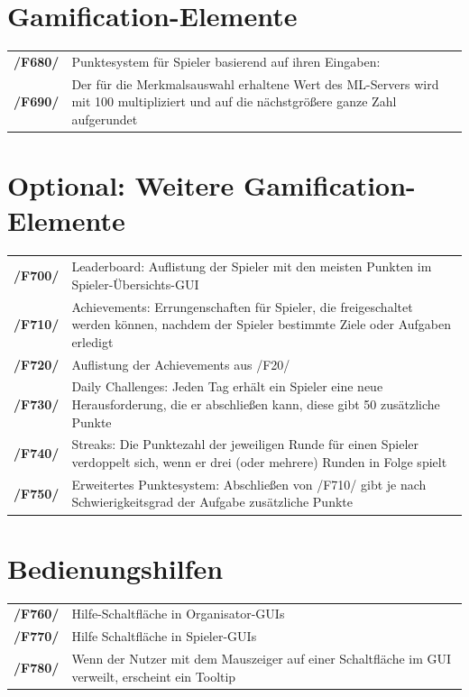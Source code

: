 \documentclass[a4paper]{scrreprt}
\begin{document}
    \section{Gamification-Elemente} %
    \label{sec:Gamification-Elemente}
    \begin{tabularx}{\linewidth}{@{}>{\bfseries}l@{\hspace{.5em}}X@{}}
    /F680/ & Punktesystem für \Gls{Spieler} basierend auf ihren Eingaben: \\
    /F690/ & Der für die Merkmalsauswahl erhaltene Wert des \Gls{ML-Server}s wird mit 100 multipliziert und
        auf die nächstgrößere ganze Zahl aufgerundet \\
    \end{tabularx}

    \section{Optional: Weitere Gamification-Elemente}
    \label{sec:Optionale Gamification-Elemente}
    \begin{tabularx}{\linewidth}{@{}>{\bfseries}l@{\hspace{.5em}}X@{}}
	/F700/ & Leaderboard: Auflistung der \Gls{Spieler} mit den meisten Punkten im Spieler-Übersichts-GUI \\
	/F710/ & Achievements: Errungenschaften für \Gls{Spieler}, die freigeschaltet werden können, nachdem der Spieler bestimmte Ziele oder Aufgaben erledigt \\
	/F720/ & Auflistung der Achievements aus /F20/ \\ %
	/F730/ & Daily Challenges: Jeden Tag erhält ein \Gls{Spieler} eine neue Herausforderung, die er abschließen kann, diese gibt 50 zusätzliche Punkte \\
	/F740/ & Streaks: Die Punktezahl der jeweiligen Runde für einen \Gls{Spieler} verdoppelt sich, wenn er drei (oder mehrere) Runden in Folge spielt \\
	/F750/ & Erweitertes Punktesystem: Abschließen von /F710/ gibt je nach Schwierigkeitsgrad der Aufgabe zusätzliche Punkte \\
    \end{tabularx}
    
    \section{Bedienungshilfen}
	\begin{tabularx}{\linewidth}{@{}>{\bfseries}l@{\hspace{.5em}}X@{}}
	/F760/ & Hilfe-Schaltfläche in Organisator-GUIs \\
	/F770/ & Hilfe Schaltfläche in Spieler-GUIs \\
	/F780/ & Wenn der \Gls{Nutzer} mit dem Mauszeiger auf einer Schaltfläche im GUI verweilt, erscheint ein Tooltip \\ %
	\end{tabularx}
\end{document}
